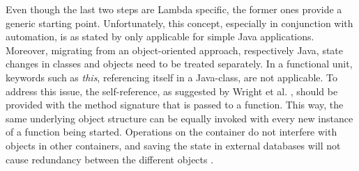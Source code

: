 \documentclass[a4paper,twoside,11pt, pagesize]{scrartcl}
\begin{document}
Even though the last two steps are Lambda specific, the former ones provide a generic starting point. Unfortunately, this concept, especially in conjunction with automation, is as stated by \cite{spillner2017Java} only applicable for simple Java applications. Moreover, migrating from an object-oriented approach, respectively Java, state changes in classes and objects need to be treated separately. In a functional unit, keywords such as \textit{this}, referencing itself in a Java-class, are not applicable. To address this issue, the self-reference, as suggested by Wright et al. \cite{wright1998compiling}, should be provided with the method signature that is passed to a function. This way, the same underlying object structure can be equally invoked with every new instance of a function being started. Operations on the container do not interfere with objects in other containers, and saving the state in external databases will not cause redundancy between the different objects \cite{spillner2017Java}.\\\\ 
\end{document}
